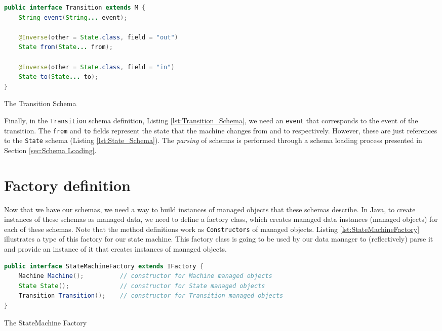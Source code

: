 \begin{sourcecode}[H]
	\begin{lstlisting}[language=Java,escapechar=|]
public interface Transition extends M {
	String event(String... event);

	@Inverse(other = State.class, field = "out")
	State from(State... from);

	@Inverse(other = State.class, field = "in")
	State to(State... to);
}
	\end{lstlisting}
	\caption{The Transition Schema}
	\label{lst:Transition_Schema}
\end{sourcecode}

Finally, in the \texttt{Transition} schema definition, Listing \ref{lst:Transition_Schema}, we need an \texttt{event} that corresponds to the event of the transition.
The \texttt{from} and \texttt{to} fields represent the state that the machine changes from and to respectively.
However, these are just references to the \texttt{State} schema (Listing \ref{lst:State_Schema}).
The \textit{parsing} of schemas is performed through a schema loading process presented in Section \ref{sec:Schema Loading}.

\section{Factory definition}
Now that we have our schemas, we need a way to build instances of managed objects that these schemas describe. 
In Java, to create instances of these schemas as managed data, we need to define a factory class, which creates managed data instances (managed objects) for each of these schemas.
Note that the method definitions work as \texttt{Constructors} of managed objects.
Listing \ref{lst:StateMachineFactory} illustrates a type of this factory for our state machine.
This factory class is going to be used by our data manager to (reflectively) parse it and provide an instance of it that creates instances of managed objects.

\begin{sourcecode}[H]
	\begin{lstlisting}[language=Java,escapechar=|]
public interface StateMachineFactory extends IFactory {
	Machine Machine();  		// constructor for Machine managed objects
	State State(); 				// constructor for State managed objects
	Transition Transition(); 	// constructor for Transition managed objects
}
	\end{lstlisting}
	\caption{The StateMachine Factory}
	\label{lst:StateMachineFactory}
\end{sourcecode}


